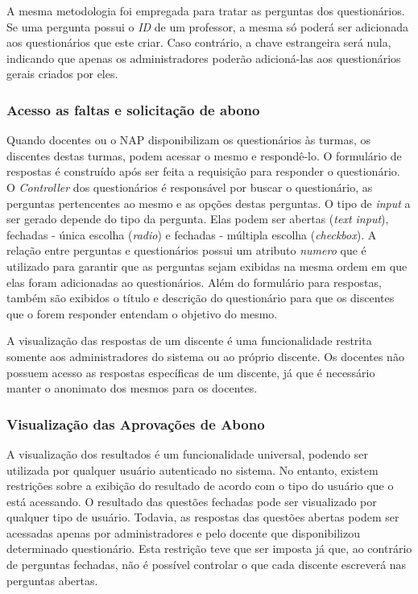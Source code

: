 \documentclass[
  12pt,       %
  openright,      %
  oneside,      %
  a4paper,      %
  english,      %
  french,        %
  spanish,     %
  brazil        %
  ]{abntex2-decsi}
\begin{document}
            A mesma metodologia foi empregada para tratar as perguntas dos questionários. Se uma pergunta possui o \textit{ID} de um professor, a mesma só poderá ser adicionada aos questionários que este criar. Caso contrário, a chave estrangeira será nula, indicando que apenas os administradores poderão adicioná-las aos questionários gerais criados por eles.

            \subsubsection{Acesso as faltas e solicitação de abono}

            Quando docentes ou o NAP disponibilizam os questionários às turmas, os discentes destas turmas, podem acessar o mesmo e respondê-lo. O formulário de respostas é construído após ser feita a requisição para responder o questionário. O \textit{Controller} dos questionários é responsável por buscar o questionário, as perguntas pertencentes ao mesmo e as opções destas perguntas. O tipo de \textit{input} a ser gerado depende do tipo da pergunta. Elas podem ser abertas (\textit{text input}), fechadas - única escolha (\textit{radio}) e fechadas - múltipla escolha (\textit{checkbox}). A relação entre perguntas e questionários possui um atributo \textit{numero} que é utilizado para garantir que as perguntas sejam exibidas na mesma ordem em que elas foram adicionadas ao questionários. Além do formulário para respostas, também são exibidos o título e descrição do questionário para que os discentes que o forem responder entendam o objetivo do mesmo. 
            
            A visualização das respostas de um discente é uma funcionalidade restrita somente aos administradores do sistema ou ao próprio discente. Os docentes não possuem acesso as respostas específicas de um discente, já que é necessário manter o anonimato dos mesmos para os docentes.

            \subsubsection{Visualização das Aprovações de Abono}

			A visualização dos resultados é um funcionalidade universal, podendo ser utilizada por qualquer usuário autenticado no sistema. No entanto, existem restrições sobre a exibição do resultado de acordo com o tipo do usuário que o está acessando. O resultado das questões fechadas pode ser visualizado por qualquer tipo de usuário. Todavia, as respostas das questões abertas podem ser acessadas apenas por administradores e pelo docente que disponibilizou determinado questionário. Esta restrição teve que ser imposta já que, ao contrário de perguntas fechadas, não é possível controlar o que cada discente escreverá nas perguntas abertas.
\end{document}
